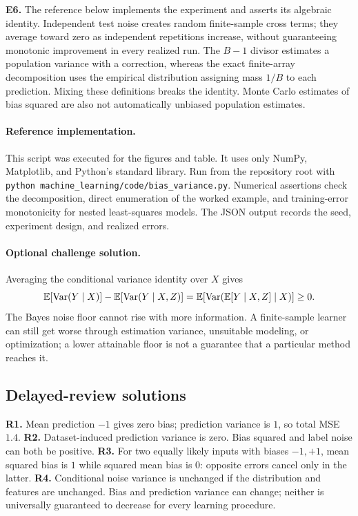 \textbf{E6.} The reference below implements the experiment and asserts its algebraic identity. Independent test noise creates random finite-sample cross terms; they average toward zero as independent repetitions increase, without guaranteeing monotonic improvement in every realized run. The $B-1$ divisor estimates a population variance with a correction, whereas the exact finite-array decomposition uses the empirical distribution assigning mass $1/B$ to each prediction. Mixing these definitions breaks the identity. Monte Carlo estimates of bias squared are also not automatically unbiased population estimates.

\paragraph{Reference implementation.} This script was executed for the figures and table. It uses only NumPy, Matplotlib, and Python's standard library. Run from the repository root with \texttt{python machine\_learning/code/bias\_variance.py}. Numerical assertions check the decomposition, direct enumeration of the worked example, and training-error monotonicity for nested least-squares models. The JSON output records the seed, experiment design, and realized errors.


\paragraph{Optional challenge solution.}
Averaging the conditional variance identity over $X$ gives
\[
\mathbb{E}[\operatorname{Var}(Y\mid X)]-\mathbb{E}[\operatorname{Var}(Y\mid X,Z)]
=\mathbb{E}[\operatorname{Var}(\mathbb{E}[Y\mid X,Z]\mid X)]\geq0.
\]
The Bayes noise floor cannot rise with more information. A finite-sample learner can still get worse through estimation variance, unsuitable modeling, or optimization; a lower attainable floor is not a guarantee that a particular method reaches it.

\subsection*{Delayed-review solutions}
\textbf{R1.} Mean prediction $-1$ gives zero bias; prediction variance is $1$, so total MSE $1.4$. \textbf{R2.} Dataset-induced prediction variance is zero. Bias squared and label noise can both be positive. \textbf{R3.} For two equally likely inputs with biases $-1,+1$, mean squared bias is $1$ while squared mean bias is $0$: opposite errors cancel only in the latter. \textbf{R4.} Conditional noise variance is unchanged if the distribution and features are unchanged. Bias and prediction variance can change; neither is universally guaranteed to decrease for every learning procedure.


